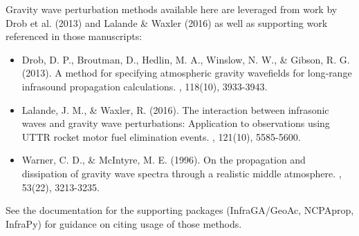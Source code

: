 \documentclass[letterpaper,10pt,english]{sphinxmanual}
\begin{document}
Gravity wave perturbation methods available here are leveraged from work by Drob et al. (2013) and Lalande \& Waxler (2016) as well as supporting work referenced in those manuscripts:
\begin{itemize}
\item {} 
Drob, D. P., Broutman, D., Hedlin, M. A., Winslow, N. W., \& Gibson, R. G. (2013). A method for specifying atmospheric gravity wavefields for long‐range infrasound propagation calculations. , 118(10), 3933-3943.

\item {} 
Lalande, J. M., \& Waxler, R. (2016). The interaction between infrasonic waves and gravity wave perturbations: Application to observations using UTTR rocket motor fuel elimination events. , 121(10), 5585-5600.

\item {} 
Warner, C. D., \& McIntyre, M. E. (1996). On the propagation and dissipation of gravity wave spectra through a realistic middle atmosphere. , 53(22), 3213-3235.

\end{itemize}

See the documentation for the supporting packages (InfraGA/GeoAc, NCPAprop, InfraPy) for guidance on citing usage of those methods.


\renewcommand{\indexname}{Python Module Index}
\begin{sphinxtheindex}
\let\bigletter\sphinxstyleindexlettergroup
\bigletter{s}
\item\relax{}
\item\relax{}
\item\relax{}
\item\relax{}
\end{sphinxtheindex}

\renewcommand{\indexname}{Index}
\printindex
\end{document}

